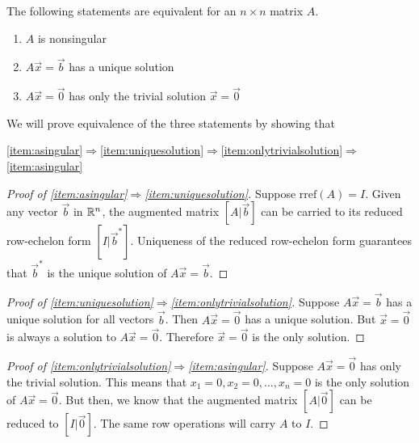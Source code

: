\documentclass{ximera}
\begin{document}
\begin{theorem}\label{th:nonsingularequivalency1} The following statements are equivalent for an $n\times n$ matrix $A$.
\begin{enumerate}
\item\label{item:asingular} $A$ is nonsingular
\item\label{item:uniquesolution} $A\vec{x}=\vec{b}$ has a unique solution
\item\label{item:onlytrivialsolution} $A\vec{x}=\vec{0}$ has only the trivial solution $\vec{x}=\vec{0}$
\end{enumerate}
\end{theorem}
We will prove equivalence of the three statements by showing that
\begin{center}
\ref{item:asingular}$\Rightarrow$\ref{item:uniquesolution}$\Rightarrow$\ref{item:onlytrivialsolution}$\Rightarrow$\ref{item:asingular}
\end{center}
\begin{proof}[Proof of \ref{item:asingular}$\Rightarrow$\ref{item:uniquesolution}]
Suppose $\mbox{rref}(A)=I$.  Given any vector $\vec{b}$ in $\mathbb{R}^n$, the augmented matrix $[A|\vec{b}]$ can be carried to its reduced row-echelon form $[I|\vec{b}^*]$.  Uniqueness of the reduced row-echelon form guarantees that $\vec{b}^*$ is the unique solution of $A\vec{x}=\vec{b}$. 
\end{proof}
\begin{proof}[Proof of \ref{item:uniquesolution}$\Rightarrow$\ref{item:onlytrivialsolution}]
Suppose $A\vec{x}=\vec{b}$ has a unique solution for all vectors $\vec{b}$.  Then $A\vec{x}=\vec{0}$ has a unique solution.  But $\vec{x}=\vec{0}$ is always a solution to $A\vec{x}=\vec{0}$.  Therefore $\vec{x}=\vec{0}$ is the only solution.
\end{proof}
\begin{proof}[Proof of \ref{item:onlytrivialsolution}$\Rightarrow$\ref{item:asingular}]
Suppose $A\vec{x}=\vec{0}$ has only the trivial solution.  This means that $x_1=0, x_2=0,\dots ,x_n=0$ is the only solution of $A\vec{x}=\vec{0}$.  But then, we know that the augmented matrix $[A|\vec{0}]$ can be reduced to $[I|\vec{0}]$.  The same row operations will carry $A$ to $I$.
\end{proof}
\end{document}
